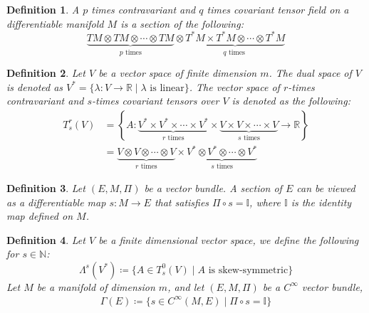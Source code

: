 \documentclass[11pt]{book}
\theoremstyle{break}
\theoremstyle{break}
\newtheorem{defn}{Definition}[corL]
\newcommand{\R}{\mathbb{R}}
\newcommand{\N}{\mathbb{N}}
\begin{document}
\begin{defn}
A $p$ times contravariant and $q$ times covariant tensor field on a differentiable manifold $M$ is a section of the following: 
$$\underbrace{TM\otimes TM \otimes  \cdots \otimes TM}_{p \text{ times}} \otimes \underbrace{T^*M \times T^*M \otimes \cdots \otimes T^*M}_{q \text{ times }}$$
\end{defn}


\begin{defn}
Let $V$ be a vector space of finite dimension $m$. The dual space of $V$ is denoted as $V^* = \{ \lambda: V\to \R\mid \lambda \text{ is linear}\}$. The vector space of $r$-times contravariant and $s$-times covariant tensors over $V$ is denoted as the following:
\begin{align*}
T_s^r(V) 
&=\left\{ A: \underbrace{V^*\times V^*\times \cdots \times V^*}_{r \text{ times}} \times \underbrace{V \times V \times \cdots \times V}_{s \text{ times}} \to \R\right\} \\
&= \underbrace{V\otimes V\otimes \cdots \otimes V}_{r \text{ times}} \times \underbrace{V^* \otimes V^* \otimes \cdots \otimes V^*}_{s \text{ times}} 
\end{align*}
\end{defn}

\begin{defn}
Let $(E,M,\Pi)$ be a vector bundle. A section of $E$ can be viewed as a differentiable map $s:M \to E$ that satisfies $\Pi\circ s = \mathbb{I}$, where $\mathbb{I}$ is the identity map defined on $M$. 
\end{defn}


\begin{defn}
Let $V$ be a finite dimensional vector space, we define the following for $s \in \N$: 
$$\Lambda^s(V^*)\coloneqq \{ A \in T_s^0 (V) \mid A\text{ is skew-symmetric}\}$$
Let $M$ be a manifold of dimension $m$, and let $(E, M, \Pi)$ be a $C^\infty$ vector bundle,
\begin{align*}
\Gamma(E) \coloneqq \{ s\in C^{\infty}(M,E) \mid \Pi \circ s = \mathbb{I}\}
\end{align*} 
\end{defn}
\end{document}
